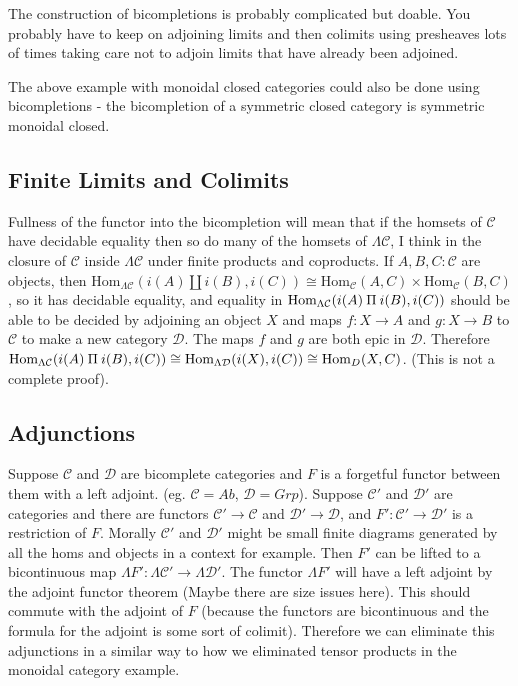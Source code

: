 \documentclass[12pt]{article} %
\theoremstyle{definition}
\theoremstyle{definition}
\theoremstyle{definition}
\theoremstyle{definition}
\newcommand{\invamalg}{\mathbin{\text{\rotatebox[origin=c]{180}{$\amalg$}}}}
\begin{document}
The construction of bicompletions is probably complicated but doable. You probably have to keep on adjoining limits and then colimits
using presheaves lots of times taking care not to adjoin limits that have already been adjoined.

The above example with monoidal closed categories could also be done using bicompletions - the bicompletion of a symmetric closed category
is symmetric monoidal closed.

\subsection{Finite Limits and Colimits}

Fullness of the functor into the bicompletion will mean that if the homsets of $\mathcal{C}$ have decidable equality then so do 
many of the homsets of $\Lambda \mathcal{C}$, I think in the closure of $\mathcal{C}$ inside $\Lambda \mathcal{C}$ 
under finite products and coproducts. If $A, B, C : \mathcal{C}$ are objects, then 
$\text{Hom}_{\Lambda \mathcal{C}} (i(A) \amalg i(B), i(C)) \cong \text{Hom}_\mathcal{C} (A, C) \times \text{Hom}_\mathcal{C} (B, C)$,
so it has decidable equality, and equality in 
$\text{Hom}_{\Lambda \mathcal{C}} (i(A) \invamalg i(B), i(C))$ should be able to be decided by adjoining
an object $X$ and maps $f : X \rightarrow A$ and $g : X \rightarrow B$ to $\mathcal{C}$ to make a new
category $\mathcal{D}$. The maps $f$ and $g$ are both epic in $\mathcal{D}$. Therefore 
$\text{Hom}_{\Lambda \mathcal{C}} (i(A) \invamalg i(B), i(C)) \cong 
\text{Hom}_{\Lambda \mathcal{D}} (i(X), i(C)) \cong \text{Hom}_{D} (X, C)$. (This is not a complete proof).

\subsection{Adjunctions}

Suppose $\mathcal{C}$ and $\mathcal{D}$ are bicomplete categories and $F$ is a forgetful functor between them with a 
left adjoint. (eg. $\mathcal{C} = Ab$, $\mathcal{D} = Grp$). Suppose $\mathcal{C}'$ and $\mathcal{D}'$ are categories
and there are functors $\mathcal{C}' \rightarrow \mathcal{C}$ and $\mathcal{D}' \rightarrow \mathcal{D}$,
and $F' : \mathcal{C}' \rightarrow \mathcal{D}'$ is a restriction of $F$. Morally $\mathcal{C}'$ and $\mathcal{D}'$ might be
small finite diagrams generated by all the homs and objects in a context for example.
Then $F'$ can be lifted to a bicontinuous map $\Lambda F' : \Lambda \mathcal{C}' \rightarrow \Lambda \mathcal{D}'$.
The functor $\Lambda{F}'$ will have a left adjoint by the adjoint functor theorem (Maybe there are size issues here).
This should commute with the adjoint of $F$ (because the functors are bicontinuous and the formula for the adjoint is 
some sort of colimit). Therefore we can eliminate this adjunctions in a similar way to how we eliminated tensor products 
in the monoidal category example.
\end{document}
